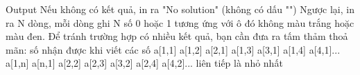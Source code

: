 Output
Nếu không có kết quả, in ra "No solution" (không có dấu "") Ngược lại, in ra N dòng, mỗi dòng ghi N số 0 hoặc 1 tương ứng với ô đó không màu trắng hoặc màu đen. Để tránh trường hợp có nhiều kết quả, bạn cần đưa ra tấm thảm thoả mãn: số nhận được khi viết các số a[1,1] a[1,2] a[2,1] a[1,3] a[3,1] a[1,4] a[4,1]... a[1,n] a[n,1] a[2,2] a[2,3] a[3,2] a[2,4] a[4,2]... liên tiếp là nhỏ nhất